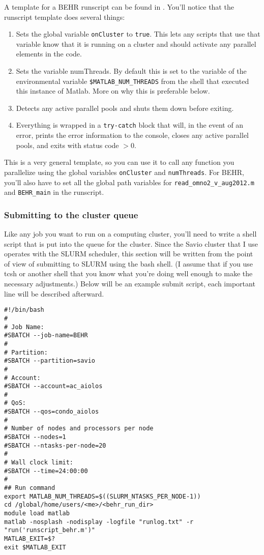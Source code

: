 \documentclass[12pt]{article}
\begin{document}
		A template for a BEHR runscript can be found in . You'll notice that the runscript template does several things:
		\begin{enumerate}
			\item Sets the global variable \lstinline[breaklines=true]|onCluster| to \lstinline[breaklines=true]|true|.  This lets any scripts that use that variable know that it is running on a cluster and should activate any parallel elements in the code.
			\item Sets the variable numThreads.  By default this is set to the variable of the environmental variable \lstinline[breaklines=true]|$MATLAB_NUM_THREADS| from the shell that executed this instance of Matlab. More on why this is preferable below.
			\item Detects any active parallel pools and shuts them down before exiting.
			\item Everything is wrapped in a \lstinline[breaklines=true]|try-catch| block that will, in the event of an error, prints the error information to the console, closes any active parallel pools, and exits with status code $> 0$.
		\end{enumerate}

		This is a very general template, so you can use it to call any function you parallelize using the global variables \lstinline[breaklines=true]|onCluster| and \lstinline[breaklines=true]|numThreads|.  For BEHR, you'll also have to set all the global path variables for \lstinline[breaklines=true]|read_omno2_v_aug2012.m| and \lstinline[breaklines=true]|BEHR_main| in the runscript.
		
	\subsubsection{Submitting to the cluster queue} \label{sec:ClusterQueueMatlab}
		Like any job you want to run on a computing cluster, you'll need to write a shell script that is put into the queue for the cluster.  Since the Savio cluster that I use operates with the SLURM scheduler, this section will be written from the point of view of submitting to SLURM using the bash shell. (I assume that if you use tcsh or another shell that you know what you're doing well enough to make the necessary adjustments.) Below will be an example submit script, each important line will be described afterward.

\lstset{numbers=left}
\begin{lstlisting}
#!/bin/bash
#
# Job Name:
#SBATCH --job-name=BEHR
#
# Partition:
#SBATCH --partition=savio
#
# Account:
#SBATCH --account=ac_aiolos
# 
# QoS:
#SBATCH --qos=condo_aiolos
#
# Number of nodes and processors per node
#SBATCH --nodes=1
#SBATCH --ntasks-per-node=20
#
# Wall clock limit:
#SBATCH --time=24:00:00
#
## Run command
export MATLAB_NUM_THREADS=$((SLURM_NTASKS_PER_NODE-1))
cd /global/home/users/<me>/<behr_run_dir>
module load matlab
matlab -nosplash -nodisplay -logfile "runlog.txt" -r "run('runscript_behr.m')"
MATLAB_EXIT=$?
exit $MATLAB_EXIT
\end{lstlisting}
\lstset{numbers=none}
\end{document}
